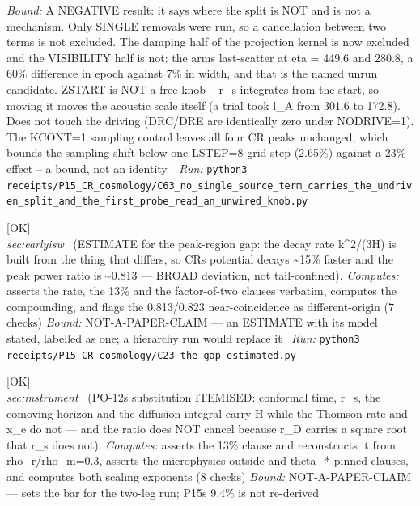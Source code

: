 \begin{description}
 \emph{Bound:} A NEGATIVE result: it says where the split is NOT and is not a mechanism. Only SINGLE removals were run, so a cancellation between two terms is not excluded. The damping half of the projection kernel is now excluded and the VISIBILITY half is not: the arms last-scatter at eta = 449.6 and 280.8, a 60\% difference in epoch against 7\% in width, and that is the named unrun candidate. ZSTART is NOT a free knob -- r\_s integrates from the start, so moving it moves the acoustic scale itself (a trial took l\_A from 301.6 to 172.8). Does not touch the driving (DRC/DRE are identically zero under NODRIVE=1). The KCONT=1 sampling control leaves all four CR peaks unchanged, which bounds the sampling shift below one LSTEP=8 grid step (2.65\%) against a 23\% effect -- a bound, not an identity.
\ \emph{Run:} \texttt{python3 receipts/P15\_CR\_cosmology/C63\_no\_single\_source\_term\_carries\_the\_undriven\_split\_and\_the\_first\_probe\_read\_an\_unwired\_knob.py}
\item[\rcptlabel{C23_the_gap_estimated}{P15R113}\textbf{P15R113}\quad\texttt{C23\_the\_gap\_estimated}]\hfill\textsf{[OK]}\\
\textit{sec:earlyisw} \ (ESTIMATE for the peak-region gap: the decay rate k\textasciicircum{}2/(3H) is built from the thing that differs, so CRs potential decays \textasciitilde{}15\% faster and the peak power ratio is \textasciitilde{}0.813 --- BROAD deviation, not tail-confined). 
\emph{Computes:} asserts the rate, the 13\% and the factor-of-two clauses verbatim, computes the compounding, and flags the 0.813/0.823 near-coincidence as different-origin (7 checks)
 \emph{Bound:} NOT-A-PAPER-CLAIM --- an ESTIMATE with its model stated, labelled as one; a hierarchy run would replace it
\ \emph{Run:} \texttt{python3 receipts/P15\_CR\_cosmology/C23\_the\_gap\_estimated.py}
\item[\rcptlabel{C24_the_substitution_itemised}{P15R114}\textbf{P15R114}\quad\texttt{C24\_the\_substitution\_itemised}]\hfill\textsf{[OK]}\\
\textit{sec:instrument} \ (PO-12s substitution ITEMISED: conformal time, r\_s, the comoving horizon and the diffusion integral carry H while the Thomson rate and x\_e do not --- and the ratio does NOT cancel because r\_D carries a square root that r\_s does not). 
\emph{Computes:} asserts the 13\% clause and reconstructs it from rho\_r/rho\_m=0.3, asserts the microphysics-outside and theta\_*-pinned clauses, and computes both scaling exponents (8 checks)
 \emph{Bound:} NOT-A-PAPER-CLAIM --- sets the bar for the two-leg run; P15s 9.4\% is not re-derived

\end{description}
